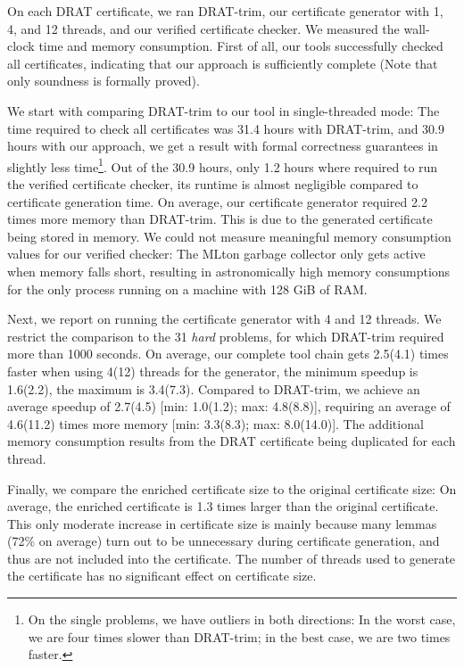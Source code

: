 \documentclass{llncs}
\begin{document}
On each DRAT certificate, we ran DRAT-trim, our certificate generator with 1, 4, and 12 threads, and our verified certificate checker. 
We measured the wall-clock time and memory consumption. First of all, our tools successfully checked all certificates, indicating that our approach is sufficiently complete (Note that only soundness is formally proved). 

We start with comparing DRAT-trim to our tool in single-threaded mode: The time required to check all certificates was 31.4 hours with DRAT-trim, and 30.9 hours with our approach, \ie we 
get a result with formal correctness guarantees in slightly less time\footnote{On the single problems, we have outliers in both directions: In the worst case, we are four times slower than DRAT-trim; in the best case, we are two times faster.}. Out of the 30.9 hours, only 1.2 hours where required to run the verified certificate checker, \ie its runtime is almost negligible compared to certificate generation time. On average, our certificate generator required 2.2 times more memory than DRAT-trim. This is due to the generated certificate being stored 
in memory. We could not measure meaningful memory consumption values for our verified checker: The MLton garbage collector only gets active when memory falls short, 
resulting in astronomically high memory consumptions for the only process running on a machine with 128 GiB of RAM.

Next, we report on running the certificate generator with 4 and 12 threads. 
We restrict the comparison to the 31 \emph{hard} problems, for which DRAT-trim required more than 1000 seconds.
On average, our complete tool chain gets 2.5(4.1) times faster when using 4(12) threads for the generator, the minimum speedup is 1.6(2.2), the maximum is 3.4(7.3).
Compared to DRAT-trim, we achieve an average speedup of 2.7(4.5) [min: 1.0(1.2); max: 4.8(8.8)], requiring an average of 4.6(11.2) times more memory [min: 3.3(8.3); max: 8.0(14.0)].
The additional memory consumption results from the DRAT certificate being duplicated for each thread.

Finally, we compare the enriched certificate size to the original certificate size: On average, the enriched certificate is 1.3 times larger than the original certificate. This only moderate increase in certificate size is mainly because many lemmas (72\% on average) turn out to be unnecessary during 
certificate generation, and thus are not included into the certificate. The number of threads used to generate the certificate has no significant effect on certificate size.
\end{document}
